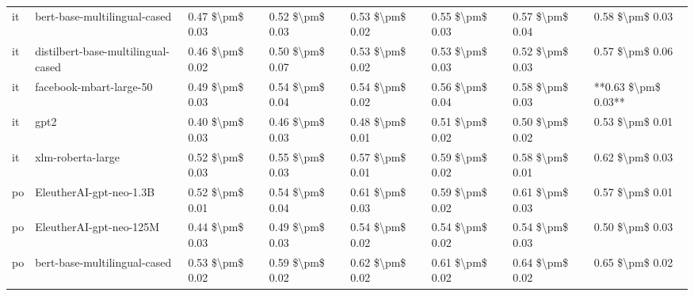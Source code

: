 \begin{tabular}{llllllll}
      it &       bert-base-multilingual-cased & 0.47 \$\textbackslash pm\$ 0.03 &           0.52 \$\textbackslash pm\$ 0.03 &       0.53 \$\textbackslash pm\$ 0.02 &        0.55 \$\textbackslash pm\$ 0.03 &                         0.57 \$\textbackslash pm\$ 0.04 &     0.58 \$\textbackslash pm\$ 0.03 \\
      it & distilbert-base-multilingual-cased & 0.46 \$\textbackslash pm\$ 0.02 &           0.50 \$\textbackslash pm\$ 0.07 &       0.53 \$\textbackslash pm\$ 0.02 &        0.53 \$\textbackslash pm\$ 0.03 &                         0.52 \$\textbackslash pm\$ 0.03 &     0.57 \$\textbackslash pm\$ 0.06 \\
      it &            facebook-mbart-large-50 & 0.49 \$\textbackslash pm\$ 0.03 &           0.54 \$\textbackslash pm\$ 0.04 &       0.54 \$\textbackslash pm\$ 0.02 &        0.56 \$\textbackslash pm\$ 0.04 &                         0.58 \$\textbackslash pm\$ 0.03 & **0.63 \$\textbackslash pm\$ 0.03** \\
      it &                               gpt2 & 0.40 \$\textbackslash pm\$ 0.03 &           0.46 \$\textbackslash pm\$ 0.03 &       0.48 \$\textbackslash pm\$ 0.01 &        0.51 \$\textbackslash pm\$ 0.02 &                         0.50 \$\textbackslash pm\$ 0.02 &     0.53 \$\textbackslash pm\$ 0.01 \\
      it &                  xlm-roberta-large & 0.52 \$\textbackslash pm\$ 0.03 &           0.55 \$\textbackslash pm\$ 0.03 &       0.57 \$\textbackslash pm\$ 0.01 &        0.59 \$\textbackslash pm\$ 0.02 &                         0.58 \$\textbackslash pm\$ 0.01 &     0.62 \$\textbackslash pm\$ 0.03 \\
      po &            EleutherAI-gpt-neo-1.3B & 0.52 \$\textbackslash pm\$ 0.01 &           0.54 \$\textbackslash pm\$ 0.04 &       0.61 \$\textbackslash pm\$ 0.03 &        0.59 \$\textbackslash pm\$ 0.02 &                         0.61 \$\textbackslash pm\$ 0.03 &     0.57 \$\textbackslash pm\$ 0.01 \\
      po &            EleutherAI-gpt-neo-125M & 0.44 \$\textbackslash pm\$ 0.03 &           0.49 \$\textbackslash pm\$ 0.03 &       0.54 \$\textbackslash pm\$ 0.02 &        0.54 \$\textbackslash pm\$ 0.02 &                         0.54 \$\textbackslash pm\$ 0.03 &     0.50 \$\textbackslash pm\$ 0.03 \\
      po &       bert-base-multilingual-cased & 0.53 \$\textbackslash pm\$ 0.02 &           0.59 \$\textbackslash pm\$ 0.02 &       0.62 \$\textbackslash pm\$ 0.02 &        0.61 \$\textbackslash pm\$ 0.02 &                         0.64 \$\textbackslash pm\$ 0.02 &     0.65 \$\textbackslash pm\$ 0.02 \\

\end{tabular}
